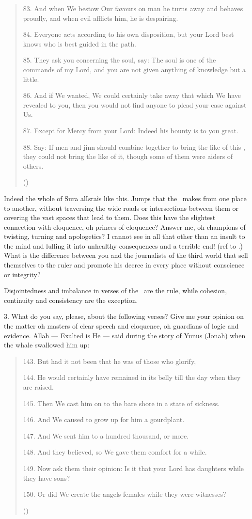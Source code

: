 \documentclass[12pt]{memoir}
\begin{document}
\begin{quote}
83. And when We bestow Our favours on man he turns away and behaves proudly,
and when evil afflicts him, he is despairing.

84. Everyone acts according to his own disposition,
but your Lord best knows who is best guided in the path.

85. They ask you concerning the soul, say:
The soul is one of the commands of my Lord,
and you are not given anything of knowledge but a little.

86. And if We wanted, We could certainly take away
that which We have revealed to you,
then you would not find anyone to plead your case against Us.

87. Except for Mercy from your Lord: Indeed his bounty is to you great.

88. Say: If men and jinn should combine together
to bring the like of this \Quran,
they could not bring the like of it,
though some of them were aiders of others.

()
\end{quote}

Indeed the whole of Sura al\–Isra\` is like this.
Jumps that the \Quran\ makes from one place to another,
without traversing the wide roads or intersections between them
or covering the vast spaces that lead to them.
Does this have the slightest connection with eloquence,
oh princes of eloquence?
Answer me, oh champions of twisting, turning and apologetics?
I cannot see in all that other than an insult to the mind
and lulling it into unhealthy consequences and a terrible end!
(ref to \Quran.)\@
What is the difference between you and the journalists of the third world
that sell themselves to the ruler and promote his decree
in every place without conscience or integrity?

Disjointedness and imbalance in verses of the \Quran\ are the rule,
while cohesion, continuity and consistency are the exception.

3. What do you say, please, about the following verses?
Give me your opinion on the matter oh masters of clear speech and eloquence,
oh guardians of logic and evidence.
Allah — Exalted is He — said during the story of Yunus (Jonah)
when the whale swallowed him up:

\begin{quote}
143. But had it not been that he was of those who glorify,

144. He would certainly have remained in its belly
till the day when they are raised.

145. Then We cast him on to the bare shore in a state of sickness.

146. And We caused to grow up for him a gourd\–plant.

147. And We sent him to a hundred thousand, or more.

148. And they believed, so We gave them comfort for a while.

149. Now ask them their opinion:
Is it that your Lord has daughters while they have sons?

150. Or did We create the angels females while they were witnesses?

()
\end{quote}
\end{document}
